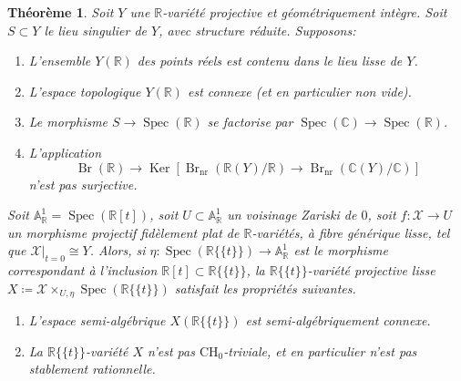 \documentclass[JEP,XML,SOM,Unicode,francais,published]{cedram}
\newenvironment{enumeratei}
{\bgroup\def\theenumi{\roman{enumi}}\def\theenumii{\arabic{enumii}}\begin{enumerate}}
{\end{enumerate}\egroup}
\newenvironment{enumeratea}
{\bgroup\def\theenumi{\alph{enumi}}\begin{enumerate}}
{\end{enumerate}\egroup}
\newcommand{\CH}{\mathrm{CH}}
\newtheorem{thm}{Théorème}[section]
\theoremstyle{definition}
\newcommand{\C}{\mathbb C}
\newcommand{\R}{\mathbb R}
\newcommand{\A}{\mathbb A}
\newcommand{\Spec}{\operatorname{Spec}}
\newcommand{\Br}{\operatorname{Br}}
\newcommand{\Ker}{\operatorname{Ker}}
\newcommand{\mc}[1]{\mathcal{#1}}
\newcommand{\on}[1]{\operatorname{#1}}
\newcommand{\puiseux}{\mathbb{R}\{\!\{t\}\!\}}
\begin{document}
\begin{thm}\label{generateur}
Soit $Y$ une $\R$-variété projective et géométriquement intègre. Soit $S\subset Y$ le lieu singulier de $Y$, avec structure réduite. Supposons:
\begin{enumeratea}
\item\label{generateura}
L'ensemble $Y(\R)$ des points réels est contenu dans le lieu lisse de $Y$.
\item\label{generateurb}
L'espace topologique $Y(\R)$ est connexe (et en particulier non vide).
\item\label{generateurc}
Le morphisme $S\to \on{Spec}(\R)$ se factorise par $\Spec(\C)\to\Spec(\R)$.
\item\label{generateurd}
L'application
\[\Br(\R) \to \Ker [\Br_{\on{nr}}(\R(Y)/\R) \to \Br_{\on{nr}}(\C(Y)/\C)]\] n'est pas
surjective.
\end{enumeratea}

Soit $\A^1_\R=\Spec( \R[t])$, soit $U\subset \A^1_\R$ un voisinage Zariski de $0$, soit $f\colon \mc{X}\to U$ un morphisme projectif fidèlement plat de $\R$-variétés, à fibre générique lisse, tel que $\mc{X}|_{t=0}\cong Y$. Alors, si $\eta\colon \Spec(\puiseux)\to \A^1_\R$ est le morphisme correspondant à l'inclusion $\R[t]\subset \puiseux$, la $\puiseux$-variété projective lisse $X\coloneqq \mc{X}\times_{U,\eta}\Spec(\puiseux)$ satisfait les propriétés suivantes.

\begin{enumeratei}
\item\label{generateuri}
L'espace semi-algébrique $X(\puiseux)$ est semi-algébriquement connexe.
\item\label{generateurii}
La $\puiseux$-variété $X$ n'est pas $\CH_0$-triviale, et en particulier
n'est pas stablement rationnelle.
\end{enumeratei}
\end{thm}
\end{document}
